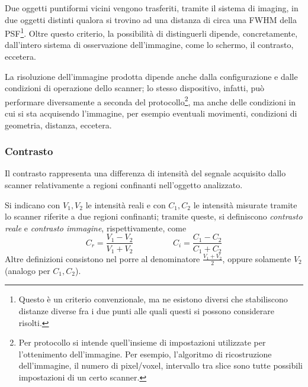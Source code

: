 \documentclass[11pt, a4paper]{scrartcl}
\theoremstyle{style}
\theoremstyle{style1}
\numberwithin{equation}{subsection}
\begin{document}
Due oggetti puntiformi vicini vengono trasferiti, tramite il sistema di imaging, in due oggetti distinti qualora si trovino ad una distanza di circa una FWHM della PSF\footnote{Questo \`e un criterio convenzionale, ma ne esistono diversi che stabiliscono distanze diverse fra i due punti alle quali questi si possono considerare risolti.}.
Oltre questo criterio, la possibilit\`a di distinguerli dipende, concretamente, dall'intero sistema di osservazione dell'immagine, come lo schermo, il contrasto, eccetera.

La risoluzione dell'immagine prodotta dipende anche dalla configurazione e dalle condizioni di operazione dello scanner; lo stesso dispositivo, infatti, pu\`o performare diversamente a seconda del protocollo\footnote{Per protocollo si intende quell'insieme di impostazioni utilizzate per l'ottenimento dell'immagine. Per esempio, l'algoritmo di ricostruzione dell'immagine, il numero di pixel/voxel, intervallo tra slice sono tutte possibili impostazioni di un certo scanner.}, ma anche delle condizioni in cui si sta acquisendo l'immagine, per esempio eventuali movimenti, condizioni di geometria, distanza, eccetera.

\subsubsection{Contrasto}

Il contrasto rappresenta una differenza di intensit\`a del segnale acquisito dallo scanner relativamente a regioni confinanti nell'oggetto analizzato. 

Si indicano con $V_1,V_2$ le intensit\`a reali e con $C_1,C_2$ le intensit\`a misurate tramite lo scanner riferite a due regioni confinanti; tramite queste, si definiscono \textit{contrasto reale} e \textit{contrasto immagine}, rispettivamente, come
\begin{equation}
	C_r  = \frac{V_1-V_2}{V_1+V_2} \hspace{2cm} C_i = \frac{C_1-C_2}{C_1+C_2}
\end{equation}
Altre definizioni consistono nel porre al denominatore $\frac{V_1+V_2}{2}$, oppure solamente $V_2$ (analogo per $C_1,C_2$).
\end{document}
